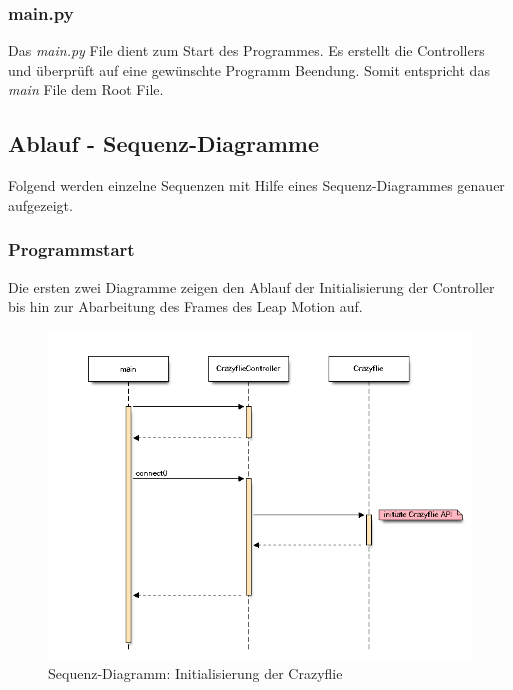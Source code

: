 \subsubsection{main.py}
Das \textit{main.py} File dient zum Start des Programmes. Es erstellt die Controllers und überprüft auf eine gewünschte Programm Beendung. Somit entspricht das \textit{main} File dem Root File.

\subsection{Ablauf - Sequenz-Diagramme}
Folgend werden einzelne Sequenzen mit Hilfe eines Sequenz-Diagrammes genauer aufgezeigt.

\subsubsection{Programmstart}
Die ersten zwei Diagramme zeigen den Ablauf der Initialisierung der Controller bis hin zur Abarbeitung des Frames des Leap Motion auf.
\begin{figure}[H]
	\centering
	\includegraphics[width=1.0\textwidth]{figures/poc/seq_dia_crazyflie.png}
	\caption{Sequenz-Diagramm: Initialisierung der Crazyflie}
\end{figure}

